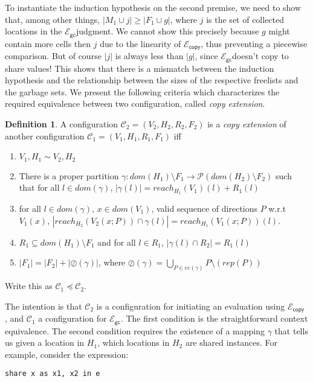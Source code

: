\documentclass{easychair}
\newcommand{\ms}[1]{\ensuremath{\mathsf{#1}}}
\newcommand{\oh}[1]{\oslash(#1)}
\newcommand{\gcSem}{\ensuremath{\mathcal{E}_{\ms{gc}}}}
\newcommand{\copySem}{\ensuremath{\mathcal{E}_{\ms{copy}}}}
\theoremstyle{definition}
\newtheorem{definition}{Definition}
\begin{document}
To instantiate the induction hypothesis on the second premise, we need to show that, among 
other things, $|M_1 \cup j| \ge |F_1 \cup g|$, where $j$ is the set of collected locations in 
the \gcSem judgment. We cannot show this precisely because $g$ might contain more cells 
then $j$ due to the linearity of \copySem, thus preventing a piecewise comparison. 
But of course $|j|$ is always less than $|g|$, since \gcSem doesn't copy to share 
values! This shows that there is a mismatch between the induction hypothesis and the relationship
between the sizes of the respective freelists and the garbage sets. We present the following 
criteria which characterizes the required equivalence between two configuration,
called \emph{copy extension}.

\begin{definition}
A configuration $\mathcal{C}_2 = (V_2,H_2,R_2,F_2)$ is a \emph{copy extension} of another configuration
$\mathcal{C}_1 = (V_1,H_1,R_1,F_1)$ iff
\begin{enumerate}
\item $V_1,H_1 \sim V_2,H_2$
\item There is a proper partition $\gamma : dom(H_1) \setminus F_1 \to \mathcal{P}(dom(H_2) \setminus F_2)$ 
such that for all $l \in dom(\gamma)$, $|\gamma(l)| = reach_{H_1}(V_1)(l) + R_1(l)$
\item for all $l \in dom(\gamma)$, $x \in dom(V_1)$, valid sequence of directions $P$ w.r.t $V_1(x)$,
	$|reach_{H_2}(V_2(x;P)) \cap \gamma(l)| = reach_{H_1}(V_1(x;P))(l)$.
\item $R_1 \subseteq dom(H_1) \setminus F_1$ and 
	for all $l \in R_1$, $|\gamma(l) \cap R_2| = R_1(l)$
\item $|F_1| = |F_2| + |\oh{\gamma}|$, where 
	$\oh{\gamma} = \bigcup_{P \in ec(\gamma)} P \setminus (rep(P))$
\end{enumerate}
Write this as $\mathcal{C}_1 \preceq \mathcal{C}_2$.
\end{definition} 
The intention is that $\mathcal{C}_2$ is a configuration for initiating an evaluation using \copySem
, and $\mathcal{C}_1$ a configuration for \gcSem. 
The first condition is the straightforward context equivalence.
The second condition requires the existence of 
a mapping $\gamma$ that tells us given a location in $H_1$, which locations in $H_2$ 
are shared instances. For example, consider the expression: 

\begin{verbatim}
share x as x1, x2 in e
\end{verbatim}
\end{document}
